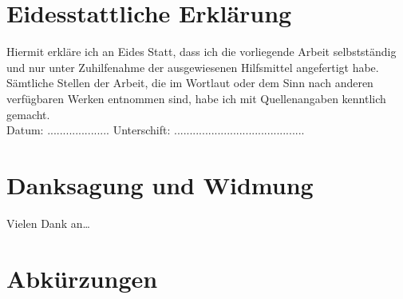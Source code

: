 \documentclass[12pt,a4paper]{scrartcl}	%
\begin{document}
\section*{Eidesstattliche Erklärung}
	
Hiermit erkläre ich an Eides Statt, dass ich die vorliegende Arbeit selbstständig und nur unter Zuhilfenahme der ausgewiesenen Hilfsmittel angefertigt habe. Sämtliche Stellen der Arbeit, die im Wortlaut oder dem Sinn nach anderen verfügbaren Werken entnommen sind, habe ich mit Quellenangaben kenntlich gemacht. \\[4ex]
	
Datum: ....................      
\hspace*{1cm}
Unterschift: ..........................................
\clearpage	

\section*{Danksagung und Widmung}
Vielen Dank an\ldots	
\clearpage

\section*{Abkürzungen}

\begin{acronym}[AAAA] 							%

\end{acronym}
\clearpage
\end{document}
